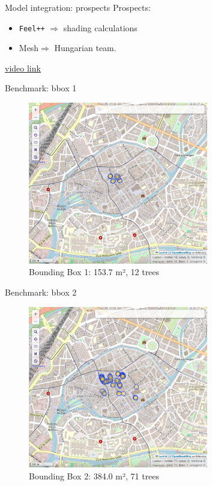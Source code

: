 \documentclass[10pt]{beamer}
\begin{document}
\begin{frame}{Model integration: prospects}
  \Large
  Prospects: 
  \begin{itemize}
    \item \texttt{Feel++} $\Longrightarrow$ shading calculations
    \item Mesh$\Longrightarrow$ Hungarian team.
  \end{itemize}
  \href{https://youtu.be/O6flpW6jR60}{video link}
  \begin{center}
\end{center}
\end{frame}

\begin{frame}{Benchmark: bbox 1}
  \Large
  \begin{figure}[H]
    \centering
    \includegraphics[width=0.7\textwidth]{images/bbox1.png}
    \caption{Bounding Box 1: 153.7 m², 12 trees}
\end{figure}
\end{frame}

\begin{frame}{Benchmark: bbox 2}
  \Large
  \begin{figure}[H]
    \centering
    \includegraphics[width=0.7\textwidth]{images/bbox2.png}
    \caption{Bounding Box 2: 384.0 m², 71 trees}
\end{figure}
\end{frame}
\end{document}
